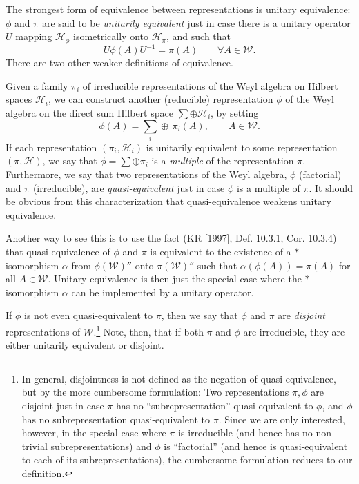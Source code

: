 \documentclass[12pt]{article}
\theoremstyle{remark}
\theoremstyle{definition}
\newcommand{\alg}[1]{\mathcal{#1}}
\newcommand{\hil}[1]{\mathcal{#1}}
\begin{document}
The strongest form of equivalence between 
representations is unitary equivalence: $\phi$ and $\pi$ are said to
be \emph{unitarily equivalent} just in case there is a unitary
operator $U$ mapping $\hil{H}_{\phi}$ isometrically onto
$\hil{H}_{\pi}$, and such that 
\begin{equation}
U\phi(A)U^{-1}=\pi(A)\qquad \forall A\in
\alg{W}.
\end{equation}  There are two other weaker definitions of equivalence.
 
Given a family $\pi _{i}$ of irreducible representations of the Weyl
algebra on Hilbert spaces $\hil{H}_{i}$, we can construct another
(reducible) representation $\phi$ of the Weyl algebra on the direct
sum Hilbert space $\sum \oplus \hil{H}_{i}$, by setting
\begin{equation} \phi (A)=\sum _{i}\oplus \,\pi _{i}(A) ,\qquad A\in
\alg{W}. \end{equation}
If each representation $(\pi _{i} ,\hil{H}_{i})$ is unitarily
equivalent to some representation $(\pi ,\hil{H})$, we say that $\phi
= \sum \oplus \pi _{i}$ is a \emph{multiple} of the representation $\pi$.
Furthermore, we say that two
representations of the Weyl algebra, $\phi$ (factorial) and $\pi$ 
(irreducible), 
are \emph{quasi-equivalent} just in case $\phi$ is a multiple of
$\pi$.  It should be obvious from this characterization that quasi-equivalence 
weakens unitary equivalence.

Another way to see this is to use the fact (KR [1997], Def. 10.3.1, 
  Cor. 10.3.4) that quasi-equivalence of $\phi$ and $\pi$ is 
equivalent to the existence of a $*$-isomorphism 
$\alpha$ from $\phi(\alg{W})''$ onto
  $\pi(\alg{W})''$ such that $\alpha (\phi(A))=\pi(A)$ for all
  $A\in \alg{W}$.  Unitary equivalence is then just the special case 
  where the $*$-isomorphism $\alpha$ can be implemented by a unitary operator.  

If $\phi$ is not even quasi-equivalent to $\pi$, then we say that
$\phi$ and $\pi$ are \emph{disjoint} representations of
$\alg{W}$.\footnote{In general, disjointness is not defined as the
  negation of quasi-equivalence, but by the more cumbersome
  formulation: Two representations $\pi ,\phi$ are disjoint just in
  case $\pi$ has no ``subrepresentation'' quasi-equivalent to $\phi$,
  and $\phi$ has no subrepresentation quasi-equivalent to $\pi$.  
  Since we
  are only interested, however, in the special case where $\pi$ is
  irreducible (and hence has no non-trivial subrepresentations) and
  $\phi$ is ``factorial'' (and hence is quasi-equivalent to each of
  its subrepresentations), the cumbersome formulation reduces to our 
  definition.} Note, then, that if both $\pi$ and $\phi$
are irreducible, they are either unitarily equivalent or
disjoint.  
\end{document}
